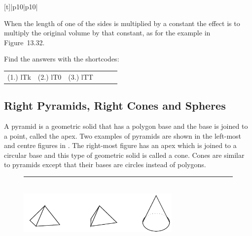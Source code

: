 {{\begin{tabular*}{\mytablewidth}[t]{|p{10\mystarwidth}|p{10\mystarwidth}|}
{\begin{mdframed}[linewidth=4, leftmargin=40, rightmargin=40]
\begin{exercise}
    \end{exercise}
    \end{mdframed}
    }
    \noindent
  
        \label{m39357*id64533}When the length of one of the sides is multiplied by a constant the effect is to multiply the original volume by that constant, as for the example in Figure~13.32.\par 
      
    

  \label{m39357*cid323}
\par {} Find the answers with the shortcodes:
 \par \begin{tabular}[h]{cccccc}
 (1.) lTk  &  (2.) lT0  &  (3.) lTT  & \end{tabular}



            \subsection{ Right Pyramids, Right Cones and Spheres}
            \nopagebreak
            
      
      \label{m39357*id62623}A pyramid is a geometric solid that has a polygon base and the base is joined to a point, called the apex. Two examples of pyramids are shown in the left-most and centre figures in . The right-most figure has an apex which is joined to a circular base and this type of geometric solid is called a cone. Cones are similar to pyramids except that their bases are circles instead of polygons.\par 
      
    \setcounter{subfigure}{0}


	\begin{figure}[H] %
    \begin{center}
    \rule[.1in]{\figurerulewidth}{.005in} \\
        \label{m39357*uid676!!!underscore!!!media}\label{m39357*uid676!!!underscore!!!printimage}\includegraphics[width=300px]{col11306.imgs/m39357_MG11C16_001.png} %
        

\end{center}
\end{figure}
\end{tabular*}}}

